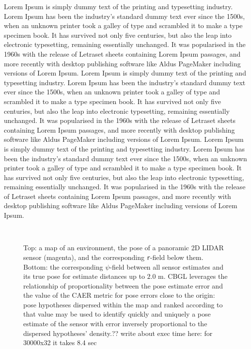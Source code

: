 Lorem Ipsum is simply dummy text of the printing and typesetting industry.
Lorem Ipsum has been the industry's standard dummy text ever since the 1500s,
when an unknown printer took a galley of type and scrambled it to make a type
specimen book. It has survived not only five centuries, but also the leap into
electronic typesetting, remaining essentially unchanged. It was popularised in
the 1960s with the release of Letraset sheets containing Lorem Ipsum passages,
and more recently with desktop publishing software like Aldus PageMaker
including versions of Lorem Ipsum. Lorem Ipsum is simply dummy text of the
printing and typesetting industry.  Lorem Ipsum has been the industry's
standard dummy text ever since the 1500s, when an unknown printer took a galley
of type and scrambled it to make a type specimen book. It has survived not only
five centuries, but also the leap into electronic typesetting, remaining
essentially unchanged. It was popularised in the 1960s with the release of
Letraset sheets containing Lorem Ipsum passages, and more recently with desktop
publishing software like Aldus PageMaker including versions of Lorem Ipsum.
Lorem Ipsum is simply dummy text of the printing and typesetting industry.
Lorem Ipsum has been the industry's standard dummy text ever since the 1500s,
when an unknown printer took a galley of type and scrambled it to make a type
specimen book. It has survived not only five centuries, but also the leap into
electronic typesetting, remaining essentially unchanged. It was popularised in
the 1960s with the release of Letraset sheets containing Lorem Ipsum passages,
and more recently with desktop publishing software like Aldus PageMaker
including versions of Lorem Ipsum.

\begin{figure}
  \subfloat{    \label{fig:a}} \vspace{-1.7cm}\\
  \subfloat{\hspace{-0.3cm} \label{fig:b}}
  \caption{\small Top: a map of an environment, the pose of a panoramic 2D
           LIDAR sensor (magenta), and the corresponding \texttt{r}-field below
           them.  Bottom: the corresponding $\psi$-field between all sensor
           estimates and its true pose for estimate distances up to $2.0$ m.
           CBGL leverages the relationship of proportionality between the pose
           estimate error and the value of the CAER metric for pose errors
           close to the origin: pose hypotheses dispersed within the map and
           ranked according to that value may be used to identify quickly and
           uniquely a pose estimate of the sensor with error inversely
           proportional to the dispersed hypotheses' density.?? write about exec
           time here: for 30000x32 it takes 8.4 sec
           }
  \vspace{-0.75cm}
  \label{fig:AB}
\end{figure}

